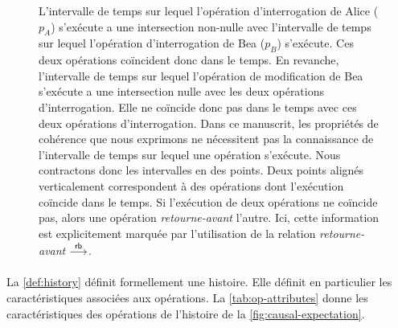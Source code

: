 \begin{figure}[ht]
\caption[Relation retourne-avant d'une histoire]{ L'intervalle de temps sur lequel l'opération d'interrogation de Alice ($p_A$) s'exécute a une intersection non-nulle avec l'intervalle de temps sur lequel l'opération d'interrogation de Bea ($p_B$) s'exécute.
Ces deux opérations coïncident donc dans le temps.
En revanche, l'intervalle de temps sur lequel l'opération de modification de Bea s'exécute a une intersection nulle avec les deux opérations d'interrogation.
Elle ne coïncide donc pas dans le temps avec ces deux opérations d'interrogation.
Dans ce manuscrit, les propriétés de cohérence que nous exprimons ne nécessitent pas la connaissance de l'intervalle de temps sur lequel une opération s'exécute.
 Nous contractons donc les intervalles en des points.
Deux points alignés verticalement correspondent à des opérations dont l'exécution coïncide dans le temps.
Si l'exécution de deux opérations ne coïncide pas, alors une opération \emph{retourne-avant} l'autre.
Ici, cette information est explicitement marquée par l'utilisation de la relation \emph{retourne-avant} $\overset{\mathsf{rb}}{\longrightarrow}$.}\label{fig:rb-example}
\end{figure}

\paragraph{}La \autoref{def:history} définit formellement une histoire.
Elle définit en particulier les caractéristiques associées aux opérations.
La \autoref{tab:op-attributes} donne les caractéristiques des opérations de l'histoire de la \autoref{fig:causal-expectation}.

